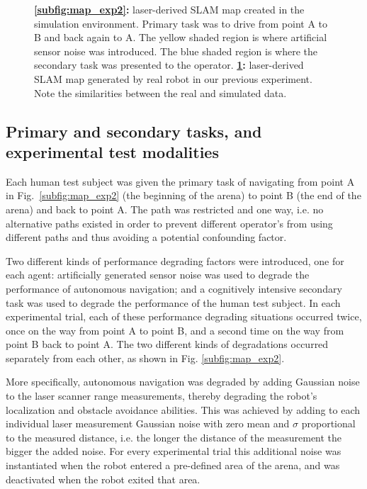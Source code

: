\documentclass[a4paper,12pt,oneside,openright]{bhamthesis}
\begin{document}
\begin{figure}
\begin{subfigure}[b]{0.45\textwidth}
		\caption{}
		\label{subfig:map_real_exp2}
	\end{subfigure}
	\hfill
	\caption{\textbf{\ref{subfig:map_exp2}:} laser-derived SLAM map created in the simulation environment. Primary task was to drive from point A to B and back again to A. The yellow shaded region is where artificial sensor noise was introduced. The blue shaded region is where the secondary task was presented to the operator. \textbf{\ref{subfig:map_real_exp2}:} laser-derived SLAM map generated by real robot in our previous experiment. Note the similarities between the real and simulated data.}
		\label{fig:maps_exp2}
	\end{figure}
	
\subsection{Primary and secondary tasks, and experimental test modalities}
Each human test subject was given the primary task of navigating from point A in Fig.~\ref{subfig:map_exp2} (the beginning of the arena) to point B (the end of the arena) and back to point A. The path was restricted and one way, i.e. no alternative paths existed in order to prevent different operator's from using different paths and thus avoiding a potential confounding factor.
	
Two different kinds of performance degrading factors were introduced, one for each agent: artificially generated sensor noise was used to degrade the performance of autonomous navigation; and a cognitively intensive secondary task was used to degrade the performance of the human test subject. In each experimental trial, each of these performance degrading situations occurred twice, once on the way from point A to point B, and a second time on the way from point B back to point A. The two different kinds of degradations occurred separately from each other, as shown in Fig. \ref{subfig:map_exp2}.
	
More specifically, autonomous navigation was degraded by adding Gaussian noise to the laser scanner range measurements, thereby degrading the robot's localization and obstacle avoidance abilities. This was achieved by adding to each individual laser measurement Gaussian noise with zero mean and $\sigma$ proportional to the measured distance, i.e. the longer the distance of the measurement the bigger the added noise. For every experimental trial this additional noise was instantiated when the robot entered a pre-defined area of the arena, and was deactivated when the robot exited that area.
	
\end{document}
